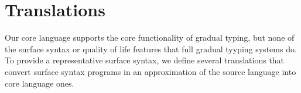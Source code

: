 \documentclass[a4paper,UKenglish,final]{lipics}
\begin{document}
\hrulefill

\begin{mathpar}

\end{mathpar}



\begin{mathpar}


\end{mathpar}



\section{Translations}

Our core language supports the core functionality of gradual typing, but none of the surface syntax or quality of life features that full gradual tyyping systems do. To provide a representative surface syntax, we define several translations that convert surface syntax programs in an approximation of the source language into core language ones. 
\end{document}
